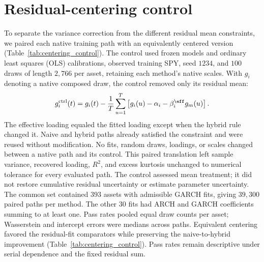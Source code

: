 \begin{table}[H]
  \centering
  \caption{\textbf{Monte Carlo uncertainty in the effect of jump settings
    under corrected composition.} Differences are relative to jumps
    disabled, with $1{,}000$ market replications per window.
    $\Delta$ACF$_{25}$ is the change in mean absolute error of the
    absolute-return autocorrelation function through lag $25$;
    negative values indicate improved temporal fit.
    $\Delta$KS is the change in Kolmogorov--Smirnov non-rejection
    rate in percentage points. Brackets contain approximate $95\%$
    Monte Carlo (MC) intervals conditional on the fitted models and
    observed histories.}
  \label{tab:jump_ablation_uncertainty}
  \footnotesize
  \setlength{\tabcolsep}{4pt}
  
\end{table}

\clearpage
\section{Residual-centering control}
\label{sec:supp-centering-control}

To separate the variance correction from the different residual mean
constraints, we paired each native training path with an equivalently
centered version (Table~\ref{tab:centering_control}). The control used frozen models and ordinary least squares (OLS) calibrations, observed training SPY, seed $1234$, and $100$ draws of length $2{,}766$ per asset, retaining each method's native scales. With $g_i$ denoting a
native composed draw, the control removed only its residual mean:
\begin{equation}
  g_i^{\mathrm{ctrl}}(t)
  = g_i(t)-\frac{1}{T}\sum_{u=1}^{T}
    \left[g_i(u)-\alpha_i-\beta_i^{\eff}g_m(u)\right].
  \label{eq:supp-centering-control}
\end{equation}
The effective loading equaled the fitted loading except when the
hybrid rule changed it. Naive and hybrid paths already satisfied the
constraint and were reused without modification. No fits, random
draws, loadings, or scales changed between a native path and its
control. This paired translation left sample variance, recovered
loading, $R^2$, and excess kurtosis unchanged to numerical tolerance
for every evaluated path. The control assessed mean treatment; it did
not restore cumulative residual uncertainty or estimate parameter
uncertainty.
The common set contained $393$ assets with admissible GARCH fits, giving $39{,}300$ paired paths per method. The other $30$ fits had ARCH and GARCH coefficients summing to at least one. Pass rates pooled equal draw counts per asset; Wasserstein and intercept errors were medians across paths. Equivalent centering favored the residual-fit comparators while preserving the naive-to-hybrid improvement (Table~\ref{tab:centering_control}). Pass rates remain descriptive under serial dependence and the fixed residual sum.

